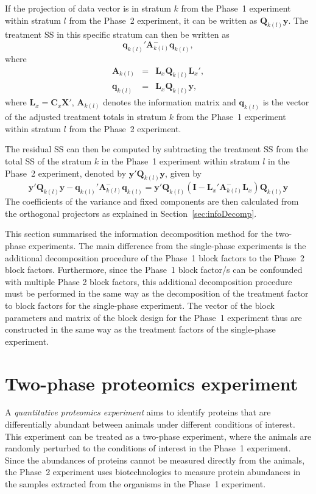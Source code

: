 \documentclass[article]{jss}
\newcommand{\I}{\mathbf{I}}
\newcommand{\X}{\mathbf{X}}
\newcommand{\Q}{\mathbf{Q}}
\newcommand{\A}{\mathbf{A}}
\newcommand{\C}{\mathbf{C}}
\newcommand{\mL}{\mathbf{L}}
\begin{document}
If the projection of data vector is in stratum $k$ from the Phase~1 experiment within stratum $l$ from the Phase~2 experiment, it can be written as $\Q_{k(l)} \bm{y}$. The treatment SS in this specific stratum can then be written as
\[
\bm{q}_{k(l)}' \A_{k(l)}^{-} \bm{q}_{k(l)},
\]
where
\begin{eqnarray*}
\A_{k(l)} &=& \mL_{x}\Q_{k(l)}\mL_{x}',\\
\bm{q}_{k(l)} &=& \mL_{x}\Q_{k(l)} \bm{y},
\end{eqnarray*}
where $\mL_{x} = \C_x \X'$, $\A_{k(l)}$ denotes the information matrix and $\bm{q}_{k(l)}$ is the vector of the adjusted treatment totals in stratum $k$ from the Phase~1 experiment within stratum $l$ from the Phase~2 experiment.

The residual SS can then be computed by subtracting the treatment SS from the total SS of the stratum $k$ in the Phase~1 experiment within stratum $l$ in the Phase~2 experiment, denoted by $\bm{y}' \Q_{k(l)} \bm{y}$, given by
\[
\bm{y}' \Q_{k(l)} \bm{y} - \bm{q}_{k(l)}' \A_{k(l)}^{-} \bm{q}_{k(l)} = \bm{y}'\Q_{k(l)}( \I - \mL_{x}' \A_{k(l)}^{-} \mL_{x}) \Q_{k(l)}\bm{y}
\]
The coefficients of the variance and fixed components are then calculated from the orthogonal projectors as explained in Section~\ref{sec:infoDecomp}.

This section summarised the information decomposition method for the two-phase experiments. The main difference from the single-phase experiments is the additional decomposition procedure of the Phase~1 block factors to the Phase~2 block factors. Furthermore, since the Phase~1 block factor/s can be confounded with multiple Phase 2 block factors, this additional decomposition procedure must be performed in the same way as the decomposition of the treatment factor to block factors for the single-phase experiment. The vector of the block parameters and matrix of the block design for the Phase~1 experiment thus are constructed in the same way as the treatment factors of the single-phase experiment.  

\section{Two-phase proteomics experiment} 
\label{sec:exampleTwoPase}
A \emph{quantitative proteomics experiment} aims to identify proteins that are differentially abundant between animals under different conditions of interest. This experiment can be treated as a two-phase experiment, where the animals are randomly perturbed to the conditions of interest in the Phase~1 experiment. Since the abundances of proteins cannot be measured directly from the animals, the Phase~2 experiment uses biotechnologies to measure protein abundances in the samples extracted from the organisms in the Phase~1 experiment.
\end{document}
